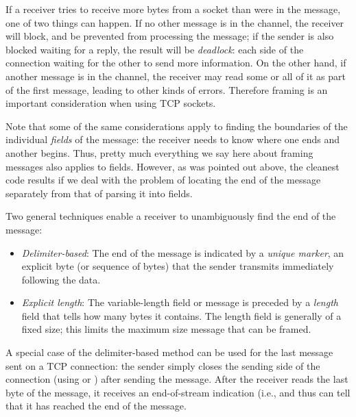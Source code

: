 If a receiver tries to receive more bytes from a socket
than were in the message, one of two things can happen.  If no other
message is in the channel, the receiver will block,
and be prevented from processing the message; if the sender is also
blocked waiting for a reply, the result will be \emph{deadlock}: each
side of the connection waiting for the other to send more information.
On the other hand, if another message is in the channel,
the receiver may read some or all of it as part of the first message,
leading to other kinds of errors.
Therefore framing is an important consideration when using TCP sockets.

Note that some of the same considerations apply to finding the
boundaries of the individual \emph{fields\/} of the message:
the receiver needs to know where one ends and another begins.
Thus, pretty much everything we say here about framing messages
also applies to fields.
However, as was pointed out above, the cleanest code results if we
deal with the problem of locating the end of the message separately
from that of parsing it into fields.

Two general techniques enable a receiver to
unambiguously find the end of the message:
%
\begin{itemize}
\item \emph{Delimiter-based}: The end of the message
is indicated by a \emph{unique marker}, an explicit byte (or sequence
of bytes) that the sender transmits immediately following the data.
\item \emph{Explicit length}: The variable-length field or message
is preceded by a  \emph{length\/} field
that tells how many bytes it contains.  The length field is generally
of a fixed size; this limits the maximum size message that can be framed.
\end{itemize}
%
A special case of the delimiter-based method can be used for
the last message sent on a TCP
connection: the sender simply closes the sending side of the
connection (using 
or )
after sending the message.
After the receiver reads the last byte of the message, it
receives an end-of-stream indication (i.e., 
and thus can tell that it has reached the end of the message.

